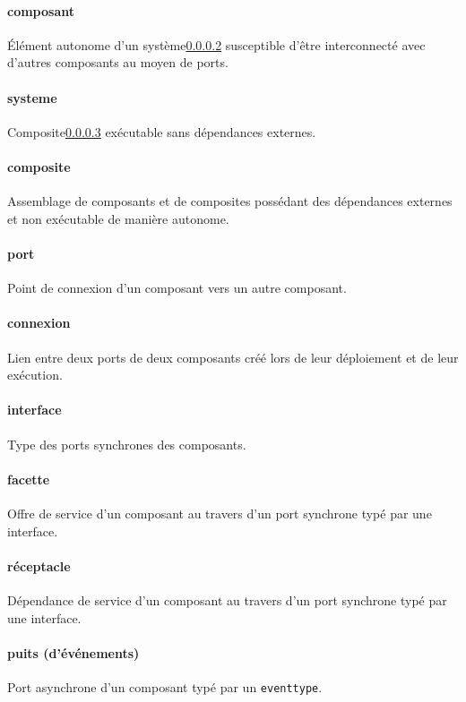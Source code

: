 \paragraph{composant} 
\label{def-composant}
\'El\'ement autonome d'un syst\`eme\ref{def-systeme} susceptible d'\^etre
interconnect\'e avec d'autres composants au moyen de ports.

\paragraph{systeme}
\label{def-systeme}
Composite\ref{def-composite} ex\'ecutable sans d\'ependances externes.

\paragraph{composite}
\label{def-composite}
Assemblage de composants et de composites poss\'edant des
d\'ependances externes et non ex\'ecutable de mani\`ere autonome. 

\paragraph{port}
Point de connexion d'un composant vers un autre composant.

\paragraph{connexion}
Lien entre deux ports de deux composants cr\'e\'e lors de leur d\'eploiement et de leur
ex\'ecution. 

\paragraph{interface}
Type des ports synchrones des composants.

\paragraph{facette}
Offre de service d'un composant au travers d'un port synchrone typ\'e
par une interface.

\paragraph{r\'eceptacle}
D\'ependance de service d'un composant au travers d'un port synchrone
typ\'e par une interface.

\paragraph{puits (d'\'ev\'enements)}
Port asynchrone d'un composant typ\'e par un \texttt{eventtype}.

